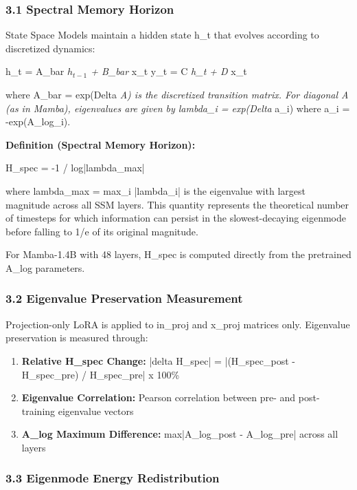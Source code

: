 
\subsubsection{3.1 Spectral Memory Horizon}

State Space Models maintain a hidden state h\_t that evolves according to discretized dynamics:

h\_t = A\_bar \textit{ $h_{t-1}$ + B\_bar } x\_t
y\_t = C \textit{ h\_t + D } x\_t

where A\_bar = exp(Delta \textit{ A) is the discretized transition matrix. For diagonal A (as in Mamba), eigenvalues are given by lambda\_i = exp(Delta } a\_i) where a\_i = -exp(A\_log\_i).

\textbf{Definition (Spectral Memory Horizon):}

H\_spec = -1 / log|lambda\_max|

where lambda\_max = max\_i |lambda\_i| is the eigenvalue with largest magnitude across all SSM layers. This quantity represents the theoretical number of timesteps for which information can persist in the slowest-decaying eigenmode before falling to 1/e of its original magnitude.

For Mamba-1.4B with 48 layers, H\_spec is computed directly from the pretrained A\_log parameters.

\subsubsection{3.2 Eigenvalue Preservation Measurement}

Projection-only LoRA is applied to in\_proj and x\_proj matrices only. Eigenvalue preservation is measured through:

\begin{enumerate}
\item \textbf{Relative H\_spec Change:} |delta H\_spec| = |(H\_spec\_post - H\_spec\_pre) / H\_spec\_pre| x 100\%
\item \textbf{Eigenvalue Correlation:} Pearson correlation between pre- and post-training eigenvalue vectors
\item \textbf{A\_log Maximum Difference:} max|A\_log\_post - A\_log\_pre| across all layers
\end{enumerate}

\subsubsection{3.3 Eigenmode Energy Redistribution}


